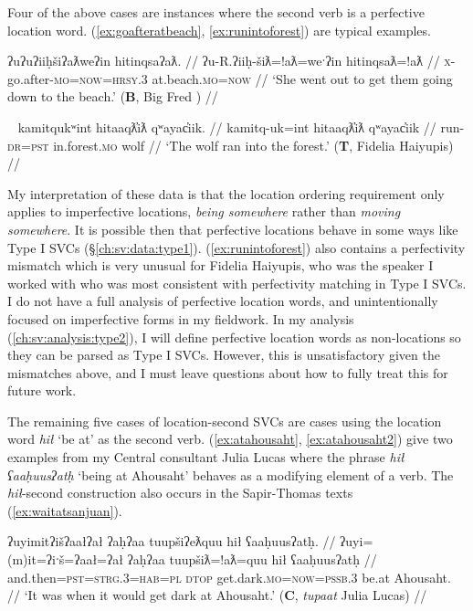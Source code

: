 Four of the above cases are instances where the second verb is a perfective location word. (\ref{ex:goafteratbeach}, \ref{ex:runintoforest}) are typical examples.

\ex \label{ex:goafteratbeach}
\begingl
\glpreamble ʔuʔuʔiiḥšiʔaƛweʔin hitinqsaʔaƛ. //
\gla ʔu-R.ʔiiḥ-šiƛ=!aƛ=weˑʔin hitinqsaƛ=!aƛ  //
\glb \textsc{x}-go.after-\textsc{mo}=\textsc{now}=\textsc{hrsy.3} at.beach.\textsc{mo}=\textsc{now} //
\glft `She went out to get them going down to the beach.' (\textbf{B}, Big Fred \citep[p.~54]{sapir1939}) //
\endgl
\xe

\ex~ \label{ex:runintoforest}
\begingl
\glpreamble kamitqukʷint hitaaqƛ̓iƛ qʷayac̓iik. //
\gla kamitq-uk=int hitaaqƛ̓iƛ qʷayac̓iik  //
\glb run-\textsc{dr}=\textsc{pst} in.forest.\textsc{mo} wolf //
\glft `The wolf ran into the forest.' (\textbf{T}, Fidelia Haiyupis) //
\endgl
\xe

My interpretation of these data is that the location ordering requirement only applies to imperfective locations, \textit{being somewhere} rather than \textit{moving somewhere}. It is possible then that perfective locations behave in some ways like Type I SVCs (\S\ref{ch:sv:data:type1}). (\ref{ex:runintoforest}) also contains a perfectivity mismatch which is very unusual for Fidelia Haiyupis, who was the speaker I worked with who was most consistent with perfectivity matching in Type I SVCs. I do not have a full analysis of perfective location words, and unintentionally focused on imperfective forms in my fieldwork. In my analysis (\ref{ch:sv:analysis:type2}), I will define perfective location words as non-locations so they can be parsed as Type I SVCs. However, this is unsatisfactory given the mismatches above, and I must leave questions about how to fully treat this for future work.

The remaining five cases of location-second SVCs are cases using the location word \textit{hił} `be at' as the second verb. (\ref{ex:atahousaht}, \ref{ex:atahousaht2}) give two examples from my Central consultant Julia Lucas where the phrase \textit{hił ʕaaḥuusʔatḥ} `being at Ahousaht' behaves as a modifying element of a verb. The \textit{hił}-second construction also occurs in the Sapir-Thomas texts (\ref{ex:waitatsanjuan}).

\ex \label{ex:atahousaht}
\begingl
\glpreamble ʔuyimitʔišʔaałʔał ʔaḥʔaa tuupšiʔeƛquu hił ʕaaḥuusʔatḥ. //
\gla ʔuyi=(m)it=ʔiˑš=ʔaał=ʔał ʔaḥʔaa tuupšiƛ=!aƛ=quu hił ʕaaḥuusʔatḥ  //
\glb and.then=\textsc{pst}=\textsc{strg.3}=\textsc{hab}=\textsc{pl} \textsc{dtop} get.dark.\textsc{mo}=\textsc{now}=\textsc{pssb.3} be.at Ahousaht. //
\glft `It was when it would get dark at Ahousaht.' (\textbf{C}, \textit{tupaat} Julia Lucas) //
\endgl
\xe

